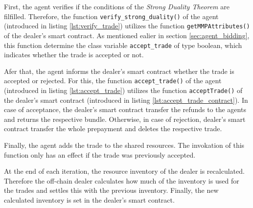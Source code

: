 First, the agent verifies if the conditions of the \textit{Strong Duality Theorem}
are filfilled.
Therefore, the function \verb|verify_strong_duality()| of the agent
(introduced in listing \ref{lst:verify_trade})
utilizes the function \verb|getMMPAttributes()| of the dealer's smart contract.
As mentioned ealier in section \ref{sec:agent_bidding}, this function 
determine the class variable \verb|accept_trade| of type boolean,
which indicates whether the trade is accepted or not.

Afer that, the agent informs the dealer's smart contract whether 
the trade is accepted or rejected.
For this, the function \verb|accept_trade()| of the agent
(introduced in listing \ref{lst:accept_trade})
utilizes the function \verb|acceptTrade()| of the dealer's smart contract
(introduced in listing \ref{lst:accept_trade_contract}).
In case of acceptance, the dealer's smart contract transfer the refunds 
to the agents and returns the respective bundle. Otherwise, in case of  
rejection, dealer's smart contract transfer the whole prepayment 
and deletes the respective trade.

Finally, the agent adds the trade to the shared resources. The invokation
of this function only has an effect if the trade was previously accepted. \newline

At the end of each iteration, the resource inventory of the dealer is recalculated.
Therefore the off-chain dealer calculates how much of the inventory is used for
the trades and settles this with the previous inventory.
Finally, the new calculated inventory is set in the dealer's smart contract.

